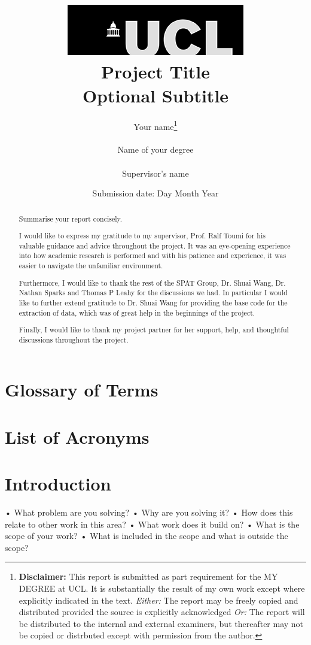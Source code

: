 \documentclass{report}
\title{  	{ \includegraphics[scale=.5]{ucl_logo.png}}\\
{{\Huge Project Title}}\\
{\large Optional Subtitle}\\
		}
\date{Submission date: Day Month Year}
\author{Your name\thanks{
{\bf Disclaimer:}
This report is submitted as part requirement for the MY DEGREE at UCL. It is
substantially the result of my own work except where explicitly indicated in the text.
\emph{Either:} The report may be freely copied and distributed provided the source is explicitly acknowledged
\newline  %
\emph{Or:}\newline
The report will be distributed to the internal and external examiners, but thereafter may not be copied or distrbuted except with permission from the author.}
\\ \\
Name of your degree\\ \\
Supervisor's name}
\begin{document}
 
 \onehalfspacing
\maketitle

\begin{abstract}
Summarise your report concisely.
\end{abstract}

\renewcommand{\abstractname}{Acknowledgements}
\begin{abstract}
I would like to express my gratitude to my supervisor, Prof. Ralf Toumi for his valuable guidance and advice throughout the project. It was an eye-opening experience into how academic research is performed and with his patience and experience, it was easier to navigate the unfamiliar environment. 

Furthermore, I would like to thank the rest of the SPAT Group, Dr. Shuai Wang, Dr. Nathan Sparks and Thomas P Leahy for the discussions we had. In particular I would like to further extend gratitude to Dr. Shuai Wang for providing the base code for the extraction of data, which was of great help in the beginnings of the project. 

Finally, I would like to thank my project partner for her support, help, and thoughtful discussions throughout the project.
\end{abstract}


\tableofcontents
\setcounter{page}{1}

\listoffigures
\listoftables

\chapter{Glossary of Terms}

\chapter{List of Acronyms} 

\chapter{Introduction}
• What problem are you solving?
• Why are you solving it?
• How does this relate to other work in this area?
• What work does it build on?
• What is the scope of your work?
• What is included in the scope and what is outside the scope?
\end{document}
